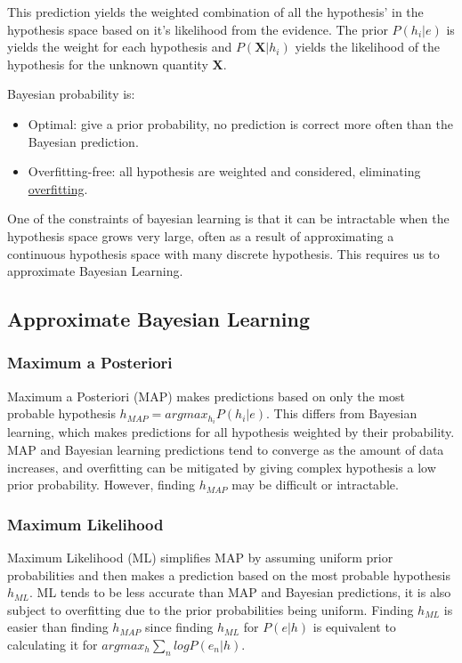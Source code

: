 \documentclass[12pt]{article}
\begin{document}
    This prediction yields the weighted combination of all the hypothesis' in the hypothesis space based on it's
    likelihood from the evidence. The prior $P(h_i | e)$ is yields the weight for each hypothesis and
    $P(\boldsymbol{X}|h_i)$ yields the likelihood of the hypothesis for the unknown quantity $\boldsymbol{X}$.

    Bayesian probability is:
    \begin{itemize}
        \item Optimal: give a prior probability, no prediction is correct more often than the Bayesian prediction.
        \item Overfitting-free: all hypothesis are weighted and considered, eliminating
        \hyperref[sec:Overfitting]{overfitting}.
    \end{itemize}

    One of the constraints of bayesian learning is that it can be intractable when the hypothesis space grows very
    large, often as a result of approximating a continuous hypothesis space with many discrete hypothesis. This requires
    us to approximate Bayesian Learning.

    \subsection{Approximate Bayesian Learning}
        \subsubsection{Maximum a Posteriori} \label{sec:MAP} Maximum a Posteriori (MAP) makes predictions based on only the
            most probable hypothesis $h_{MAP} = argmax_{h_i}P(h_i | e)$. This differs from Bayesian learning, which makes
            predictions for all hypothesis weighted by their probability. MAP and Bayesian learning predictions tend to
            converge as the amount of data increases, and overfitting can be mitigated by giving complex hypothesis a low
            prior probability. However, finding $h_{MAP}$ may be difficult or intractable.

        \subsubsection{Maximum Likelihood} \label{sec:ML} Maximum Likelihood (ML) simplifies MAP by assuming uniform prior
            probabilities and then makes a prediction based on the most probable hypothesis $h_{ML}$. ML tends to be less
            accurate than MAP and Bayesian predictions, it is also subject to overfitting due to the prior probabilities
            being uniform. Finding $h_{ML}$ is easier than finding $h_{MAP}$ since finding $h_{ML}$ for $P(e|h)$ is
            equivalent to calculating it for $argmax_h \sum_n logP(e_n |h)$.
\end{document}
